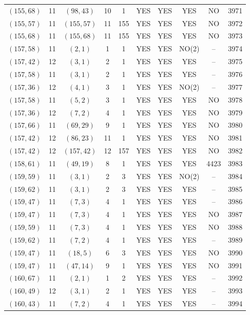 \begin{longtable}{|c|c|c|c|c|c|c|c|c|c|}
$(155, 68)$ & 11 & $(98, 43)$ & 10 & 1 & YES & YES & YES & NO & 3971\\
$(155, 57)$ & 11 & $(155, 57)$ & 11 & 155 & YES & YES & YES & NO & 3972\\
$(155, 68)$ & 11 & $(155, 68)$ & 11 & 155 & YES & YES & YES & NO & 3973\\
$(157, 58)$ & 11 & $(2, 1)$ & 1 & 1 & YES & YES & NO(2) & -- & 3974\\
$(157, 42)$ & 12 & $(3, 1)$ & 2 & 1 & YES & YES & YES & -- & 3975\\
$(157, 58)$ & 11 & $(3, 1)$ & 2 & 1 & YES & YES & YES & -- & 3976\\
$(157, 36)$ & 12 & $(4, 1)$ & 3 & 1 & YES & YES & NO(2) & -- & 3977\\
$(157, 58)$ & 11 & $(5, 2)$ & 3 & 1 & YES & YES & YES & NO & 3978\\
$(157, 36)$ & 12 & $(7, 2)$ & 4 & 1 & YES & YES & YES & NO & 3979\\
$(157, 66)$ & 11 & $(69, 29)$ & 9 & 1 & YES & YES & YES & NO & 3980\\
$(157, 42)$ & 12 & $(86, 23)$ & 11 & 1 & YES & YES & YES & NO & 3981\\
$(157, 42)$ & 12 & $(157, 42)$ & 12 & 157 & YES & YES & YES & NO & 3982\\
$(158, 61)$ & 11 & $(49, 19)$ & 8 & 1 & YES & YES & YES & 4423 & 3983\\
$(159, 59)$ & 11 & $(3, 1)$ & 2 & 3 & YES & YES & NO(2) & -- & 3984\\
$(159, 62)$ & 11 & $(3, 1)$ & 2 & 3 & YES & YES & YES & -- & 3985\\
$(159, 47)$ & 11 & $(7, 3)$ & 4 & 1 & YES & YES & YES & -- & 3986\\
$(159, 47)$ & 11 & $(7, 3)$ & 4 & 1 & YES & YES & YES & NO & 3987\\
$(159, 59)$ & 11 & $(7, 3)$ & 4 & 1 & YES & YES & YES & NO & 3988\\
$(159, 62)$ & 11 & $(7, 2)$ & 4 & 1 & YES & YES & YES & -- & 3989\\
$(159, 47)$ & 11 & $(18, 5)$ & 6 & 3 & YES & YES & YES & NO & 3990\\
$(159, 47)$ & 11 & $(47, 14)$ & 9 & 1 & YES & YES & YES & NO & 3991\\
$(160, 67)$ & 11 & $(2, 1)$ & 1 & 2 & YES & YES & YES & -- & 3992\\
$(160, 49)$ & 12 & $(3, 1)$ & 2 & 1 & YES & YES & YES & -- & 3993\\
$(160, 43)$ & 11 & $(7, 2)$ & 4 & 1 & YES & YES & YES & -- & 3994\\

\end{longtable}

